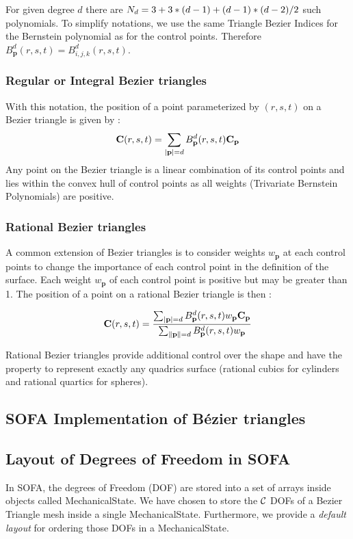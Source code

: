 \documentclass[a4paper,11pt]{article}
\newcommand{\Bezier}{{B{\'e}zier }}
\begin{document}
For given degree $d$ there are $N_d=3+3*({d}-1)+({d}-1)*({d}-2)/2$ such polynomials. To simplify notations, we use the same Triangle Bezier Indices for the Bernstein polynomial as for the control points. Therefore $B^d_{\mathbf p}(r,s,t)=B^d_{i,j,k}(r,s,t)$.

\subsubsection{Regular or Integral Bezier triangles}

With this notation, the position of a point parameterized by $(r,s,t)$ on a Bezier triangle is given by :
\[
{\mathbf C}(r,s,t)=\sum_{|\mathbf p|={d}}  B^d_{\mathbf p}(r,s,t) {\mathbf C}_{\mathbf p}
\]
Any point on the Bezier triangle is a linear combination of its control points and lies within the convex hull of control points as all weights (Trivariate Bernstein Polynomials) are positive.

\subsubsection{Rational Bezier triangles}
A common extension of Bezier triangles is to consider weights $w_{\mathbf p}$ at each control points to change the importance of each control point in the definition of the surface. Each weight  $w_{\mathbf p}$ of each control point is positive but may be greater than 1. 
The position of a point on a rational Bezier triangle is then :

\[
{\mathbf C}(r,s,t)=\frac{\sum_{|\mathbf p|={d}}  B^d_{\mathbf p}(r,s,t) w_{\mathbf p} {\mathbf C}_{\mathbf p}}{\sum_{\|\mathbf p\|={d}}  B^d_{\mathbf p}(r,s,t) w_{\mathbf p}}
\]

Rational Bezier triangles provide additional control over the shape and have the property to represent exactly any quadrics surface (rational cubics for cylinders and rational quartics for spheres).

\subsection{SOFA Implementation of \Bezier triangles}

\subsection{Layout of Degrees of Freedom in SOFA}

In SOFA, the degrees of Freedom (DOF) are stored into a set of arrays inside objects called MechanicalState.
We have chosen to store the ${\mathcal C}$ DOFs of a Bezier Triangle mesh inside a single MechanicalState. Furthermore, we provide a {\em default layout} for 
ordering those  DOFs in a MechanicalState.
 
\end{document}
